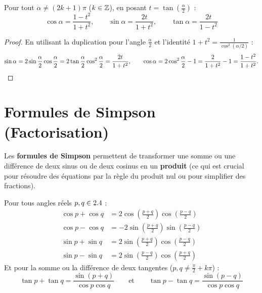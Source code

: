 \begin{theoreme}[Formules de l'angle demi en fonction de $t = \tan(\alpha/2)$]
Pour tout $\alpha \neq (2k+1)\pi$ ($k \in \mathbb{Z}$), en posant $t = \tan\left(\frac{\alpha}{2}\right)$ :
\[
    \boxed{\cos\alpha = \frac{1 - t^2}{1 + t^2}, \qquad \sin\alpha = \frac{2t}{1 + t^2}, \qquad \tan\alpha = \frac{2t}{1 - t^2}}
\]
\end{theoreme}
\begin{proof}
En utilisant la duplication pour l'angle $\frac{\alpha}{2}$ et l'identité $1 + t^2 = \frac{1}{\cos^2(\alpha/2)}$ :
\[
    \sin\alpha = 2\sin\frac{\alpha}{2}\cos\frac{\alpha}{2} = 2\tan\frac{\alpha}{2}\cos^2\frac{\alpha}{2} = \frac{2t}{1+t^2}, \qquad
    \cos\alpha = 2\cos^2\frac{\alpha}{2} - 1 = \frac{2}{1+t^2} - 1 = \frac{1-t^2}{1+t^2}. \qedhere
\]
\end{proof}

\section{Formules de Simpson (Factorisation)}

Les \textbf{formules de Simpson} permettent de transformer une somme ou une différence de deux sinus ou de deux cosinus en un \textbf{produit} (ce qui est crucial pour résoudre des équations par la règle du produit nul ou pour simplifier des fractions).

\begin{theoreme}
Pour tous angles réels $p, q \in 2.4$ :
\begin{align}
    \cos p + \cos q &= 2 \cos\left(\frac{p+q}{2}\right) \cos\left(\frac{p-q}{2}\right) \\
    \cos p - \cos q &= -2 \sin\left(\frac{p+q}{2}\right) \sin\left(\frac{p-q}{2}\right) \\
    \sin p + \sin q &= 2 \sin\left(\frac{p+q}{2}\right) \cos\left(\frac{p-q}{2}\right) \\
    \sin p - \sin q &= 2 \sin\left(\frac{p-q}{2}\right) \cos\left(\frac{p+q}{2}\right)
\end{align}
Et pour la somme ou la différence de deux tangentes ($p, q \neq \frac{\pi}{2} + k\pi$) :
\begin{equation}
    \boxed{\tan p + \tan q = \frac{\sin(p+q)}{\cos p \cos q} \qquad \text{et} \qquad \tan p - \tan q = \frac{\sin(p-q)}{\cos p \cos q}}
\end{equation}
\end{theoreme}

